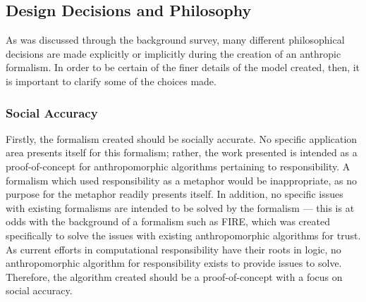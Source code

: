 \subsection{Design Decisions and Philosophy}

As was discussed through the background survey, many different philosophical decisions are made explicitly or implicitly during the creation of an anthropic formalism. In order to be certain of the finer details of the model created, then, it is important to clarify some of the choices made.\par

\subsubsection{Social Accuracy}
Firstly, the formalism created should be socially accurate. No specific application area presents itself for this formalism; rather, the work presented is intended as a proof-of-concept for anthropomorphic algorithms pertaining to responsibility. A formalism which used responsibility as a metaphor would be inappropriate, as no purpose for the metaphor readily presents itself. In addition, no specific issues with existing formalisms are intended to be solved by the formalism --- this is at odds with the background of a formalism such as FIRE, which was created specifically to solve the issues with existing anthropomorphic algorithms for trust. As current efforts in computational responsibility have their roots in logic, no anthropomorphic algorithm for responsibility exists to provide issues to solve. Therefore, the algorithm created should be a proof-of-concept with a focus on social accuracy.\par


